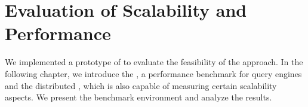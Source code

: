 \chapter{Evaluation of Scalability and Performance}
\label{chap:evaluation}

We implemented a prototype of \iqd{} to evaluate the feasibility of the approach. In the following chapter, we introduce the \tb{}, a performance benchmark for query engines and the distributed \tb{}, which is also capable of measuring certain scalability aspects. We present the benchmark environment and analyze the results.











